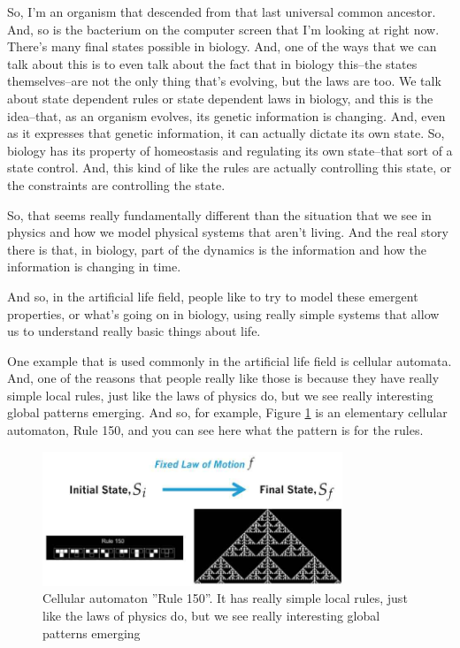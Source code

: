 \documentclass[]{article}
\begin{document}
So, I'm an organism that descended from that last universal common ancestor.
And, so is the bacterium on the computer screen that I'm looking at right now.
There's many final states possible in biology.
And, one of the ways that we can talk about this is to even talk about the fact that in biology this--the states themselves--are not the only thing that's evolving, but the laws are too.
We talk about state dependent rules or state dependent laws in biology, and this is the idea--that, as an organism evolves, its genetic information is changing.
And, even as it expresses that genetic information, it can actually dictate its own state.
So, biology has its property of homeostasis and regulating its own state--that sort of a state control.
And, this kind of like the rules are actually controlling this state, or the constraints are controlling the state.

So, that seems really fundamentally different than the situation that we see in physics
and how we model physical systems that aren't living.
And the real story there is that, in biology, part of the dynamics is the information and how the information is changing in time.

And so, in the artificial life field, people like to try to model these emergent properties, or what's going on in biology, using really simple systems that allow us to understand really basic things about life.

One example that is used commonly in the artificial life field is cellular automata.
And, one of the reasons that people really like those is because they have really simple local rules, just like the laws of physics do, but we see really interesting global patterns emerging.
And so, for example, Figure \ref{fig:cellularAutomatonRule150} is an elementary cellular automaton, Rule 150, and you can see here what the pattern is for the rules.

\begin{figure}[H]
	\caption[Cellular automaton ''Rule 150'']{Cellular automaton ''Rule 150''.  It has 	really simple local rules, just like the laws of physics do, but we see really interesting global patterns emerging}\label{fig:cellularAutomatonRule150}
	\includegraphics[width=0.8\textwidth]{cellularAutomatonRule150}
\end{figure}
\end{document}
